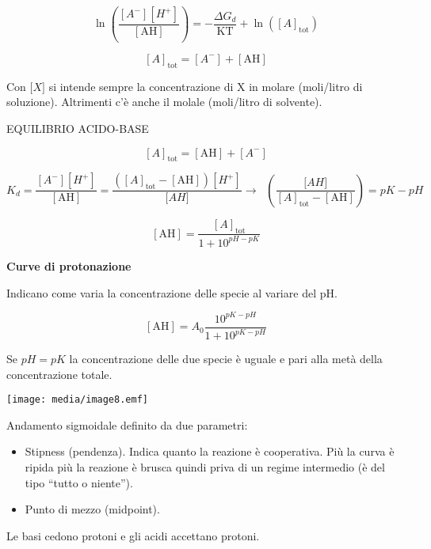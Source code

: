 \[\ln\left( \frac{\left\lbrack A^{-} \right\rbrack\left\lbrack H^{+} \right\rbrack}{\left\lbrack \text{AH} \right\rbrack} \right) = - \frac{\Delta G_{d}}{\text{KT}} + \ln\left( \left\lbrack A \right\rbrack_{\text{tot}} \right)\]

\[\left\lbrack A \right\rbrack_{\text{tot}} = \left\lbrack A^{-} \right\rbrack + \left\lbrack \text{AH} \right\rbrack\]

Con \(\lbrack X\rbrack\) si intende sempre la concentrazione di X in
molare (moli/litro di soluzione). Altrimenti c'è anche il molale
(moli/litro di solvente).

EQUILIBRIO ACIDO-BASE

\[\left\lbrack A \right\rbrack_{\text{tot}} = \left\lbrack \text{AH} \right\rbrack + \left\lbrack A^{-} \right\rbrack\]

\[K_{d} = \frac{\left\lbrack A^{-} \right\rbrack\left\lbrack H^{+} \right\rbrack}{\left\lbrack \text{AH} \right\rbrack} = \frac{\left( \left\lbrack A \right\rbrack_{\text{tot}} - \left\lbrack \text{AH} \right\rbrack \right)\left\lbrack H^{+} \right\rbrack}{\lbrack AH\rbrack} \rightarrow \operatorname{}\left( \frac{\lbrack AH\rbrack}{\left\lbrack A \right\rbrack_{\text{tot}} - \left\lbrack \text{AH} \right\rbrack} \right) = pK - pH\]

\[\left\lbrack \text{AH} \right\rbrack = \frac{\left\lbrack A \right\rbrack_{\text{tot}}}{1 + 10^{pH - pK}}\]

\textbf{Curve di protonazione}

Indicano come varia la concentrazione delle specie al variare del pH.

\[\left\lbrack \text{AH} \right\rbrack = A_{0}\frac{10^{pK - pH}}{1 + 10^{pK - pH}}\]

Se \(pH = pK\) la concentrazione delle due specie è uguale e pari alla
metà della concentrazione totale.

\texttt{[image: media/image8.emf]}

Andamento sigmoidale definito da due parametri:

\begin{itemize}
\item
  Stipness (pendenza). Indica quanto la reazione è cooperativa. Più la
  curva è ripida più la reazione è brusca quindi priva di un regime
  intermedio (è del tipo ``tutto o niente'').
\item
  Punto di mezzo (midpoint).
\end{itemize}

Le basi cedono protoni e gli acidi accettano protoni.

